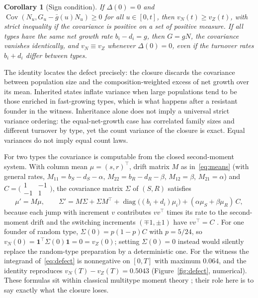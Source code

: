 \documentclass[11pt,a4paper]{article}
\theoremstyle{plain}
\newtheorem{corollary}[theorem]{Corollary}
\theoremstyle{definition}
\theoremstyle{remark}
\newcommand{\Cov}{\operatorname{Cov}}
\newcommand{\ind}{\mathbf 1}
\begin{document}
\begin{corollary}[Sign condition]\label{cor:sign}
If $\Delta(0)=0$ and $\Cov(N_u,G_u-\bar g(u)N_u)\ge0$ for all $u\in[0,t]$, then $v_N(t)\ge v_Z(t)$, with strict inequality if the covariance is positive on a set of positive measure. If all types have the same net growth rate $b_i-d_i=g$, then $G=gN$, the covariance vanishes identically, and $v_N\equiv v_Z$ whenever $\Delta(0)=0$, even if the turnover rates $b_i+d_i$ differ between types.
\end{corollary}

The identity locates the defect precisely: the closure discards the covariance between population size and the composition-weighted excess of net growth over its mean. Inherited states inflate variance when large populations tend to be those enriched in fast-growing types, which is what happens after a resistant founder in the witness. Inheritance alone does not imply a universal strict variance ordering: the equal-net-growth case has correlated family sizes and different turnover by type, yet the count variance of the closure is exact. Equal variances do not imply equal count laws.

For two types the covariance is computable from the closed second-moment system. With column mean $\mu=(s,r)^\top$, drift matrix $M$ as in~\eqref{eq:means} (with general rates, $M_{11}=b_S-d_S-\alpha$, $M_{22}=b_R-d_R-\beta$, $M_{12}=\beta$, $M_{21}=\alpha$) and $C=\bigl(\begin{smallmatrix}1&-1\\-1&1\end{smallmatrix}\bigr)$, the covariance matrix $\Sigma$ of $(S,R)$ satisfies
\begin{equation}\label{eq:secondmoment}
\mu'=M\mu,\qquad \Sigma'=M\Sigma+\Sigma M^\top+\operatorname{diag}\bigl((b_i+d_i)\mu_i\bigr)+(\alpha\mu_S+\beta\mu_R)\,C ,
\end{equation}
because each jump with increment $v$ contributes $vv^\top$ times its rate to the second-moment drift and the switching increments $(\mp1,\pm1)$ have $vv^\top=C$ \citep{andersonkurtz2015}. For one founder of random type, $\Sigma(0)=p(1-p)C$ with $p=5/24$, so $v_N(0)=\ind^\top\Sigma(0)\ind=0=v_Z(0)$; setting $\Sigma(0)=0$ instead would silently replace the random-type preparation by a deterministic one. For the witness the integrand of~\eqref{eq:defect} is nonnegative on $[0,T]$ with maximum $0.064$, and the identity reproduces $v_N(T)-v_Z(T)=0.5043$ (Figure~\ref{fig:defect}, numerical). These formulas sit within classical multitype moment theory \citep{athreyaney1972,kimmelaxelrod2015}; their role here is to say exactly what the closure loses.
\end{document}
